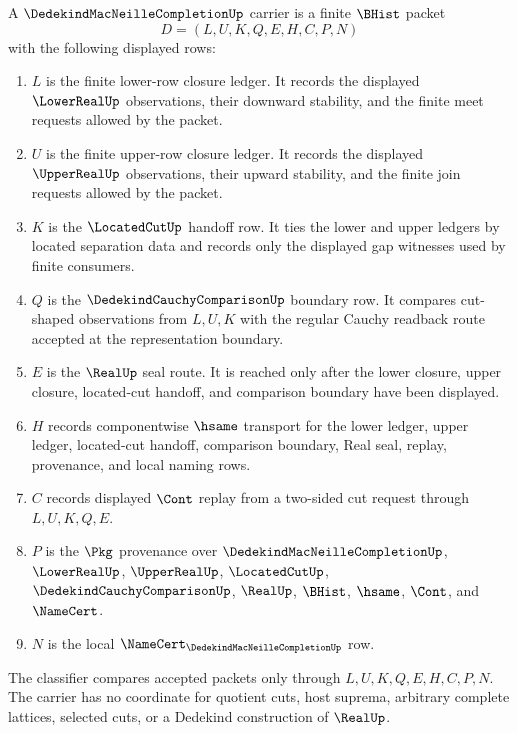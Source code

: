 \begin{definition}
\label{def:dedekind-macneille-completion-carrier}
A $\DedekindMacNeilleCompletionUp$ carrier is a finite $\BHist$ packet
$$
D=(L,U,K,Q,E,H,C,P,N)
$$
with the following displayed rows:
\begin{enumerate}
\item $L$ is the finite lower-row closure ledger. It records the displayed $\LowerRealUp$ observations, their downward stability, and the finite meet requests allowed by the packet.
\item $U$ is the finite upper-row closure ledger. It records the displayed $\UpperRealUp$ observations, their upward stability, and the finite join requests allowed by the packet.
\item $K$ is the $\LocatedCutUp$ handoff row. It ties the lower and upper ledgers by located separation data and records only the displayed gap witnesses used by finite consumers.
\item $Q$ is the $\DedekindCauchyComparisonUp$ boundary row. It compares cut-shaped observations from $L,U,K$ with the regular Cauchy readback route accepted at the representation boundary.
\item $E$ is the $\RealUp$ seal route. It is reached only after the lower closure, upper closure, located-cut handoff, and comparison boundary have been displayed.
\item $H$ records componentwise $\hsame$ transport for the lower ledger, upper ledger, located-cut handoff, comparison boundary, Real seal, replay, provenance, and local naming rows.
\item $C$ records displayed $\Cont$ replay from a two-sided cut request through $L,U,K,Q,E$.
\item $P$ is the $\Pkg$ provenance over $\DedekindMacNeilleCompletionUp$, $\LowerRealUp$, $\UpperRealUp$, $\LocatedCutUp$, $\DedekindCauchyComparisonUp$, $\RealUp$, $\BHist$, $\hsame$, $\Cont$, and $\NameCert$.
\item $N$ is the local $\NameCert_{\DedekindMacNeilleCompletionUp}$ row.
\end{enumerate}
The classifier compares accepted packets only through $L,U,K,Q,E,H,C,P,N$. The carrier has no coordinate for quotient cuts, host suprema, arbitrary complete lattices, selected cuts, or a Dedekind construction of $\RealUp$.
\end{definition}

